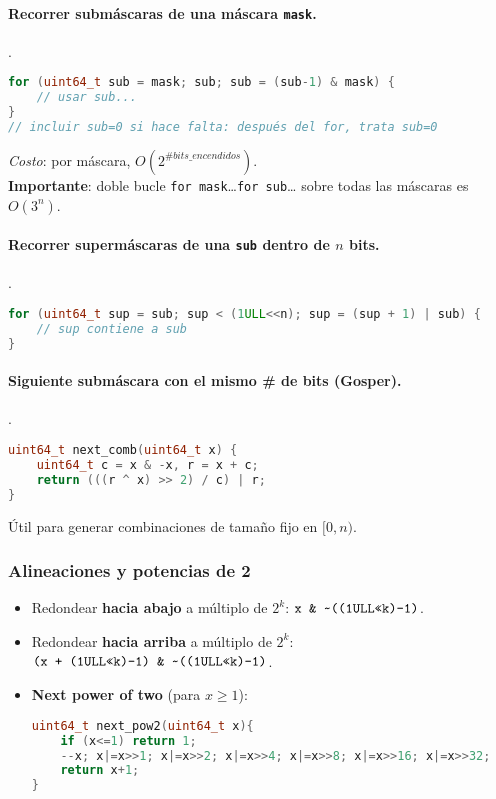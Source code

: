 \paragraph{Recorrer submáscaras de una máscara \texttt{mask}.} .
\begin{lstlisting}[language=C++]
for (uint64_t sub = mask; sub; sub = (sub-1) & mask) {
    // usar sub...
}
// incluir sub=0 si hace falta: después del for, trata sub=0
\end{lstlisting}
\textit{Costo}: por máscara, $O(2^{\#bits\_encendidos})$. \\
\textbf{Importante}: doble bucle \texttt{for mask}{\ldots}\texttt{for sub}{\ldots} sobre todas las máscaras es $O(3^n)$.

\paragraph{Recorrer supermáscaras de una \texttt{sub} dentro de $n$ bits.} .
\begin{lstlisting}[language=C++]
for (uint64_t sup = sub; sup < (1ULL<<n); sup = (sup + 1) | sub) {
    // sup contiene a sub
}
\end{lstlisting}

\paragraph{Siguiente submáscara con el mismo \# de bits (Gosper).} .
\begin{lstlisting}[language=C++]
uint64_t next_comb(uint64_t x) {
    uint64_t c = x & -x, r = x + c;
    return (((r ^ x) >> 2) / c) | r;
}
\end{lstlisting}
Útil para generar combinaciones de tamaño fijo en $[0,n)$.

\subsubsection*{Alineaciones y potencias de 2}
\begin{itemize}
  \item Redondear \textbf{hacia abajo} a múltiplo de $2^k$:
  \(\texttt{x \& \string~((1ULL<<k)-1)}\).
  \item Redondear \textbf{hacia arriba} a múltiplo de $2^k$:
  \(\texttt{(x + (1ULL<<k)-1) \& \string~((1ULL<<k)-1)}\).
  \item \textbf{Next power of two} (para $x\ge1$):
\begin{lstlisting}[language=C++]
uint64_t next_pow2(uint64_t x){
    if (x<=1) return 1;
    --x; x|=x>>1; x|=x>>2; x|=x>>4; x|=x>>8; x|=x>>16; x|=x>>32;
    return x+1;
}
\end{lstlisting}
\end{itemize}

